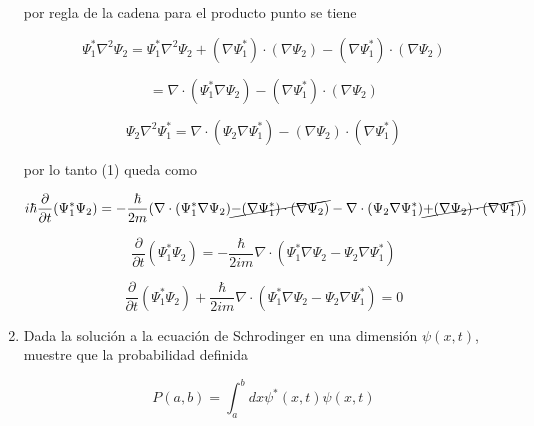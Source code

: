 \documentclass[12pt,a4paper]{article}
\begin{document}
\begin{enumerate}
    por regla de la cadena para el producto punto se tiene
    
    \begin{equation*}
        \Psi_1^* \nabla^2 \Psi_2 =  \Psi_1^* \nabla^2 \Psi_2 + (\nabla \Psi_1^*) \cdot (\nabla \Psi_2) - (\nabla \Psi_1^*) \cdot (\nabla \Psi_2)
    \end{equation*}
    
    \begin{equation*}
        = \nabla \cdot (\Psi_1^* \nabla \Psi_2) - (\nabla \Psi_1^*) \cdot (\nabla \Psi_2)
    \end{equation*}
    
    \begin{equation*}
         \Psi_2 \nabla^2 \Psi_1^* = \nabla \cdot (\Psi_2 \nabla \Psi_1^*) - (\nabla \Psi_2) \cdot (\nabla \Psi_1^*)
    \end{equation*}
    
    por lo tanto (1) queda como
    
    \begin{equation*}
         i\hbar \frac{\partial}{\partial t} (\Psi_1^* \Psi_2) = -\frac{\hbar}{2m}(\nabla \cdot (\Psi_1^* \nabla \Psi_2) \cancel{- (\nabla \Psi_1^*) \cdot (\nabla \Psi_2) }- \nabla \cdot (\Psi_2 \nabla \Psi_1^*) \cancel{+ (\nabla \Psi_2) \cdot (\nabla \Psi_1^*)})
    \end{equation*}
    
    \begin{equation*}
        \frac{\partial}{\partial t} (\Psi_1^* \Psi_2) = -\frac{\hbar}{2im}\nabla \cdot (\Psi_1^* \nabla \Psi_2 - \Psi_2 \nabla \Psi_1^*)
    \end{equation*}
    
    \begin{equation*}
        \frac{\partial}{\partial t} (\Psi_1^* \Psi_2) + \frac{\hbar}{2im}\nabla \cdot (\Psi_1^* \nabla \Psi_2 - \Psi_2 \nabla \Psi_1^*) = 0
    \end{equation*}
    
    
    
    
    
    
    
    
    \item Dada la solución a la ecuación de Schrodinger en una dimensión $\psi(x,t)$, muestre que la probabilidad definida 
    
    \begin{equation*}
        P(a,b) = \int_{a}^{b} dx \psi^{*} (x,t) \psi(x,t)
    \end{equation*}
    

\end{enumerate}
\end{document}
